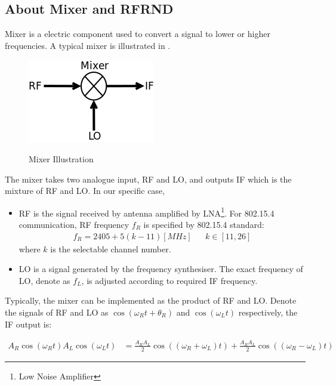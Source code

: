 \subsection{About Mixer and RFRND}

Mixer is a electric component used to convert a signal to lower or higher frequencies. A typical mixer is illustrated in .

\begin{figure}
\center
\caption{Mixer Illustration}
\includegraphics[width=0.5\linewidth]{figures/mixer.png}
\label{mixer}
\end{figure}

The mixer takes two analogue input, RF and LO, and outputs IF which is the mixture of RF and LO. In our specific case,
\begin{itemize}
\item RF is the signal received by antenna amplified by LNA\footnote{Low Noise Amplifier}. For 802.15.4 communication, RF frequency $f_{R}$ is specified by 802.15.4 standard\cite{802154_Standard}:
\begin{eqnarray}
f_{R} = 2405 + 5(k-11) [MHz] && k \in [11, 26]
\end{eqnarray}
where $k$ is the selectable channel number.

\item LO is a signal generated by the frequency synthesiser. The exact frequency of LO, denote as $f_{L}$, is adjusted according to required IF frequency.
\end{itemize}

Typically, the mixer can be implemented as the product of RF and LO. Denote the signals of RF and LO as $\cos(\omega_{R}t + \theta_{R})$ and $\cos(\omega_{L}t)$ respectively, the IF output is:

\begin{equation} \label{IF}
\begin{split}
A_{R}\cos(\omega_{R}t)A_{L}\cos(\omega_{L}t) &= {\frac{A_{R}A_{L}}{2}}\cos((\omega_{R} + \omega_{L})t) + {\frac{A_{R}A_{L}}{2}}\cos((\omega_{R} - \omega_{L})t)
\end{split}
\end{equation} 

